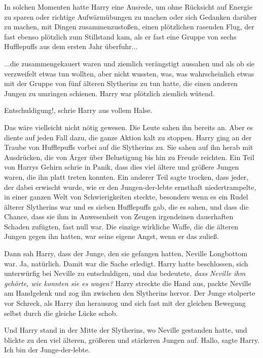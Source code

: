 In solchen Momenten hatte Harry eine Ausrede, um ohne Rücksicht auf Energie zu
sparen oder richtige Aufwärmübungen zu machen oder sich Gedanken darüber zu
machen, mit Dingen zusammenzustoßen, einen plötzlichen rasenden Flug, der fast
ebenso plötzlich zum Stillstand kam, als er fast eine Gruppe von sechs
Hufflepuffs aus dem ersten Jahr überfuhr...

...die zusammengekauert waren und ziemlich verängstigt aussahen und als ob sie
verzweifelt etwas tun wollten, aber nicht wussten, was, was wahrscheinlich etwas
mit der Gruppe von fünf älteren Slytherins zu tun hatte, die einen anderen
Jungen zu umringen schienen. Harry war plötzlich ziemlich wütend.

\glqq Entschuldigung!\grqq{}, schrie Harry aus vollem Halse.

Das wäre vielleicht nicht nötig gewesen. Die Leute sahen ihn bereits an. Aber es
diente auf jeden Fall dazu, die ganze Aktion kalt zu stoppen. Harry ging an der
Traube von Hufflepuffs vorbei auf die Slytherins zu. Sie sahen auf ihn herab mit
Ausdrücken, die von Ärger über Belustigung bis hin zu Freude reichten. Ein Teil
von Harrys Gehirn schrie in Panik, dass dies viel ältere und größere Jungen
waren, die ihn platt treten konnten. Ein anderer Teil sagte trocken, dass jeder,
der dabei erwischt wurde, wie er den Jungen-der-lebte ernsthaft niedertrampelte,
in einer ganzen Welt von Schwierigkeiten steckte, besonders wenn es ein Rudel
älterer Slytherins war und es sieben Hufflepuffs gab, die es sahen, und dass die
Chance, dass sie ihm in Anwesenheit von Zeugen irgendeinen dauerhaften Schaden
zufügten, fast null war. Die einzige wirkliche Waffe, die die älteren Jungen
gegen ihn hatten, war seine eigene Angst, wenn er das zuließ.

Dann sah Harry, dass der Junge, den sie gefangen hatten, Neville Longbottom war.
Ja, natürlich. Damit war die Sache erledigt. Harry hatte beschlossen, sich
unterwürfig bei Neville zu entschuldigen, und das bedeutete, \emph{dass Neville
ihm gehörte, wie konnten sie es wagen?} Harry streckte die Hand aus, packte
Neville am Handgelenk und zog ihn zwischen den Slytherins hervor. Der Junge
stolperte vor Schreck, als Harry ihn herauszog und sich fast mit der gleichen
Bewegung selbst durch die gleiche Lücke schob.

Und Harry stand in der Mitte der Slytherins, wo Neville gestanden hatte, und
blickte zu den viel älteren, größeren und stärkeren Jungen auf. \glqq
Hallo\grqq{}, sagte Harry. \glqq Ich bin der Junge-der-lebte.\grqq{}

